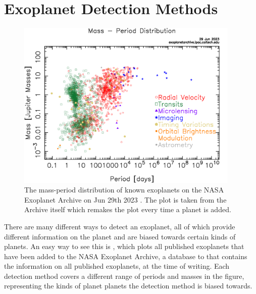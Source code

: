 
\section{Exoplanet Detection Methods}
\label{sec:detection_methods}

\begin{figure}
  \begin{center}
    \includegraphics[width=0.95\textwidth]{intro/exo_massperiod.png}
  \end{center}
  \caption{The mass-period distribution of known exoplanets on the 
  NASA Exoplanet Archive on Jun 29th 2023
  \citep{akesonNASAExoplanet2013}. The plot is taken from the Archive
  itself which remakes the plot every time a planet is added.}
  \label{fig:archive_exoplanet_distribution}
\end{figure}

There are many different ways to detect an exoplanet, all of which provide
different information on the planet and are biased towards certain kinds of
planets. An easy way to see this is ,
which plots all published exoplanets that have been added to the NASA Exoplanet
Archive, a database to that contains the information on all published
exoplanets, at the time of writing. Each detection method covers a different
range of periods and masses in the figure, representing the kinds of planet
planets the detection method is biased towards.

